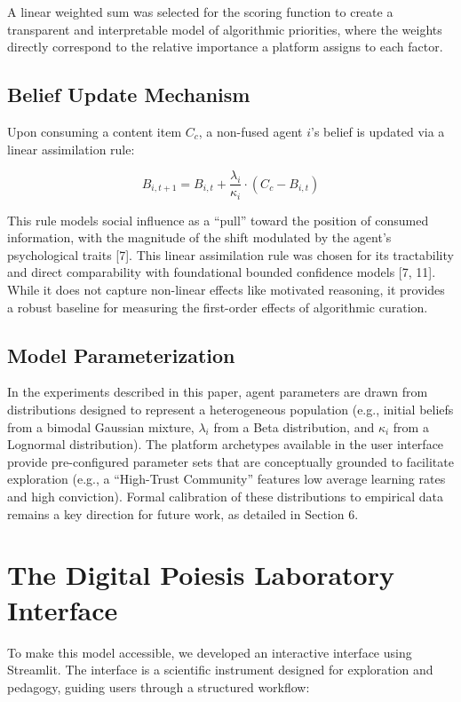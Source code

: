 \documentclass[11pt]{article}
\begin{document}
A linear weighted sum was selected for the scoring function to create a transparent and interpretable model of algorithmic priorities, where the weights directly correspond to the relative importance a platform assigns to each factor.

\subsection{Belief Update Mechanism}

Upon consuming a content item $C_c$, a non-fused agent $i$’s belief is updated via a linear assimilation rule:

\begin{equation}
B_{i,t+1} = B_{i,t} + \frac{\lambda_i}{\kappa_i} \cdot (C_c - B_{i,t})
\end{equation}

This rule models social influence as a ``pull'' toward the position of consumed information, with the magnitude of the shift modulated by the agent’s psychological traits [7]. This linear assimilation rule was chosen for its tractability and direct comparability with foundational bounded confidence models [7, 11]. While it does not capture non-linear effects like motivated reasoning, it provides a robust baseline for measuring the first-order effects of algorithmic curation.

\subsection{Model Parameterization}

In the experiments described in this paper, agent parameters are drawn from distributions designed to represent a heterogeneous population (e.g., initial beliefs from a bimodal Gaussian mixture, $\lambda_i$ from a Beta distribution, and $\kappa_i$ from a Lognormal distribution). The platform archetypes available in the user interface provide pre-configured parameter sets that are conceptually grounded to facilitate exploration (e.g., a ``High-Trust Community'' features low average learning rates and high conviction). Formal calibration of these distributions to empirical data remains a key direction for future work, as detailed in Section 6.

\section{The Digital Poiesis Laboratory Interface}

To make this model accessible, we developed an interactive interface using Streamlit. The interface is a scientific instrument designed for exploration and pedagogy, guiding users through a structured workflow:
\end{document}
